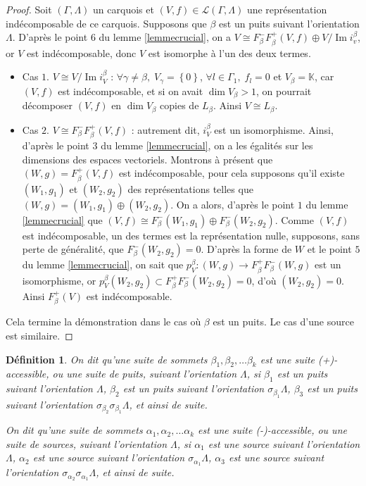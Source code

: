 \documentclass[a4paper,11pt]{article}
\newtheorem{defi}[thm]{Définition}%
\DeclareMathOperator{\Img}{Im}
\begin{document}
\begin{proof}
	Soit $(\Gamma,\Lambda)$ un carquois et $(V,f)\in\mathscr L(\Gamma,\Lambda)$ une représentation indécomposable de ce carquois. Supposons que $\beta$ est un puits suivant l'orientation $\Lambda$. D'après le point $6$ du lemme \ref{lemmecrucial}, on a $V\cong F_\beta^-F_\beta^+(V,f)\oplus V/\Img i_v^\beta$, or $V$ est indécomposable, donc $V$ est isomorphe à l'un des deux termes.
	\begin{itemize}
		\item Cas $1$. $V\cong V/\Img i_V^\beta$ : $\forall \gamma\neq\beta,\;V_\gamma=\left\{ 0 \right\}$, $\forall l\in\Gamma_1,\;f_l=0$ et $V_\beta=\mathbb K$, car $(V,f)$ est indécomposable, et si on avait $\dim V_\beta>1$, on pourrait décomposer $(V,f)$ en $\dim V_\beta$ copies de $L_\beta$. Ainsi $V\cong L_\beta$.
		\item Cas $2$. $V\cong F_\beta^-F_\beta^+(V,f)$ : autrement dit, $i_V^\beta$ est un isomorphisme. Ainsi, d'après le point $3$ du lemme \ref{lemmecrucial}, on a les égalités sur les dimensions des espaces vectoriels. Montrons à présent que $(W,g)=F_\beta^+(V,f)$ est indécomposable, pour cela supposons qu'il existe $(W_1,g_1)$ et $(W_2,g_2)$ des représentations telles que $(W,g)=(W_1,g_1)\oplus(W_2,g_2)$. On a alors, d'après le point $1$ du lemme \ref{lemmecrucial} que $(V,f)\cong F_\beta^-(W_1,g_1)\oplus F_\beta^-(W_2,g_2)$. Comme $(V,f)$ est indécomposable, un des termes est la représentation nulle, supposons, sans perte de généralité, que $F_\beta^-(W_2,g_2)=0$. D'après la forme de $W$ et le point $5$ du lemme \ref{lemmecrucial}, on sait que $p_V^\beta:(W,g)\rightarrow F_\beta^+F_\beta^-(W,g)$ est un isomorphisme, or $p_V^\beta(W_2,g_2)\subset F_\beta^+F_\beta^-(W_2,g_2)=0$, d'où $(W_2,g_2)=0$. Ainsi $F_\beta^+(V)$ est indécomposable. 
	\end{itemize}
        Cela termine la démonstration dans le cas où $\beta$ est un puits. Le cas d'une source est similaire.
\end{proof}
\begin{defi}
	On dit qu'une suite de sommets $\beta_1,\beta_2,\dots\beta_k$ est une suite \emph{(+)-accessible}, ou une \emph{suite de puits}, suivant l'orientation $\Lambda$, si $\beta_1$ est un puits suivant l'orientation $\Lambda$, $\beta_2$ est un puits suivant l'orientation $\sigma_{\beta_1}\Lambda$, $\beta_3$ est un puits suivant l'orientation $\sigma_{\beta_2}\sigma_{\beta_1}\Lambda$, et ainsi de suite.

	On dit qu'une suite de sommets $\alpha_1,\alpha_2,\dots\alpha_k$ est une suite \emph{(-)-accessible}, ou une \emph{suite de sources}, suivant l'orientation $\Lambda$, si $\alpha_1$ est une source suivant l'orientation $\Lambda$, $\alpha_2$ est une source suivant l'orientation $\sigma_{\alpha_1}\Lambda$, $\alpha_3$ est une source suivant l'orientation $\sigma_{\alpha_2}\sigma_{\alpha_1}\Lambda$, et ainsi de suite.
\end{defi}
\end{document}
